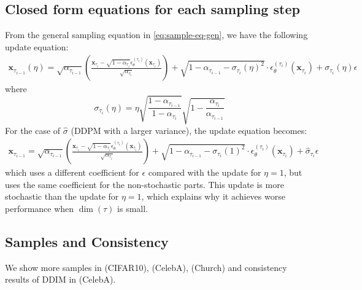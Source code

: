 \subsection{Closed form equations for each sampling step}
\label{app:equations}

From the general sampling equation in \eqref{eq:sample-eq-gen}, we have the following update equation:
\begin{align}
    \bm{x}_{\tau_{i-1}}(\eta) = \sqrt{\alpha_{\tau_{i-1}}} \left(\frac{\bm{x}_{\tau_{i}} - \sqrt{1 - \alpha_{\tau_i}} \epsilon_\theta^{(\tau_i)}(\bm{x}_{\tau_{i}})}{\sqrt{\alpha_{\tau_i}}}\right) + \sqrt{1 - \alpha_{\tau_{i-1}} - \sigma_{\tau_i}(\eta)^2} \cdot \epsilon_\theta^{(\tau_i)}(\bm{x}_{\tau_{i}}) + \sigma_{\tau_i}(\eta) \epsilon \nonumber
\end{align}
where
$$\sigma_{\tau_{i}}(\eta) = \eta \sqrt{\frac{1 - \alpha_{\tau_{i-1}}}{1 - \alpha_{\tau_{i}}}}\sqrt{1 - \frac{\alpha_{\tau_i}}{\alpha_{\tau_{i-1}}}}$$
For the case of $\hat{\sigma}$ (DDPM with a larger variance), the update equation becomes:
\begin{align}
    \bm{x}_{\tau_{i-1}} = \sqrt{\alpha_{\tau_{i-1}}} \left(\frac{\bm{x}_{\tau_{i}} - \sqrt{1 - \alpha_{\tau_i}} \epsilon_\theta^{(\tau_i)}(\bm{x}_{\tau_{i}})}{\sqrt{\alpha_{\tau_i}}}\right) + \sqrt{1 - \alpha_{\tau_{i-1}} - \sigma_{\tau_i}(1)^2} \cdot \epsilon_\theta^{(\tau_i)}(\bm{x}_{\tau_{i}}) + \hat{\sigma}_{\tau_{i}} \epsilon \nonumber
\end{align}
which uses a different coefficient for $\epsilon$ compared with the update for $\eta = 1$, but uses the same coefficient for the non-stochastic parts. This update is more stochastic than the update for $\eta = 1$, which explains why it achieves worse performance when $\dim(\tau)$ is small.





\subsection{Samples and Consistency}
\label{app:samples}

We show more samples in  (CIFAR10),  (CelebA),  (Church) and consistency results of DDIM in  (CelebA).

